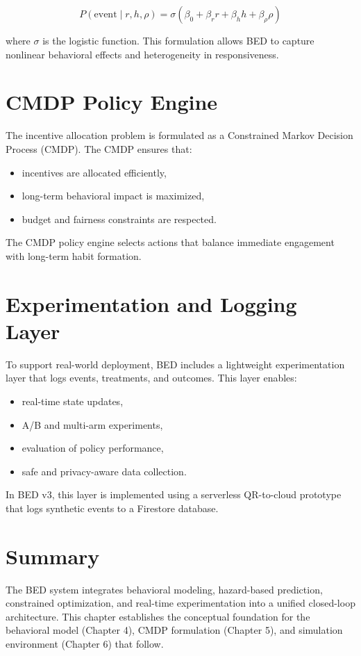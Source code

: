 \[
P(\text{event} \mid r, h, \rho) = \sigma(\beta_0 + \beta_r r + \beta_h h + \beta_\rho \rho)
\]



where $\sigma$ is the logistic function. This formulation allows BED to capture
nonlinear behavioral effects and heterogeneity in responsiveness.

\section{CMDP Policy Engine}

The incentive allocation problem is formulated as a Constrained Markov Decision
Process (CMDP). The CMDP ensures that:

\begin{itemize}
    \item incentives are allocated efficiently,
    \item long-term behavioral impact is maximized,
    \item budget and fairness constraints are respected.
\end{itemize}

The CMDP policy engine selects actions that balance immediate engagement with
long-term habit formation.

\section{Experimentation and Logging Layer}

To support real-world deployment, BED includes a lightweight experimentation
layer that logs events, treatments, and outcomes. This layer enables:

\begin{itemize}
    \item real-time state updates,
    \item A/B and multi-arm experiments,
    \item evaluation of policy performance,
    \item safe and privacy-aware data collection.
\end{itemize}

In BED v3, this layer is implemented using a serverless QR-to-cloud prototype
that logs synthetic events to a Firestore database.

\section{Summary}

The BED system integrates behavioral modeling, hazard-based prediction,
constrained optimization, and real-time experimentation into a unified
closed-loop architecture. This chapter establishes the conceptual foundation for
the behavioral model (Chapter 4), CMDP formulation (Chapter 5), and simulation
environment (Chapter 6) that follow.

